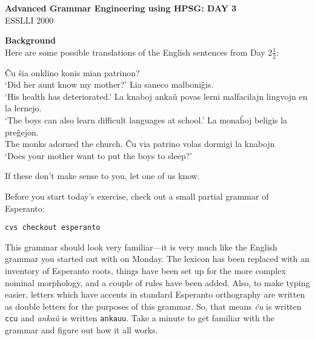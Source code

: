 \documentclass[11pt]{article}
\begin{document}
\begin{center}
\textbf{Advanced Grammar Engineering using HPSG: DAY 3}\\
ESSLLI 2000
\end{center}

\smallskip
\noindent\textbf{Background}\\
Here are some possible translations of the English sentences from Day
2$\frac12$:
\begin{exe}
\ex
\begin{xlist}
\ex \^Cu \^sia onklino konis mian patrinon?\\
`Did her aunt know my mother?'
\ex Lia saneco malboni\^gis.\\
`His health has deteriorated.'
\ex La knaboj anka\v{u} povas lerni malfacilajn lingvojn en la lernejo.\\
`The boys can also learn difficult languages at school.'
\ex La mona\^hoj beligis la pre\^gejon.\\
The monks adorned the church.
\ex \^Cu via patrino volas dormigi la knabojn\\
`Does your mother want to put the boys to sleep?'
\end{xlist}
\end{exe}
If these don't make sense to you, let one of us know. 

Before you start today's exercise, check out a small partial grammar of
Esperanto:
\begin{verbatim}
cvs checkout esperanto
\end{verbatim}
This grammar should look very familiar---it is very much like the English
grammar you started out with on Monday. The lexicon has been replaced with an
inventory of Esperanto roots, things have been set up for the more complex
nominal morphology, and a couple of rules have been added. Also, to make
typing easier, letters which have accents in standard Esperanto orthography
are written as double letters for the purposes of this grammar.  So, that
means \emph{\^cu} is written \texttt{ccu} and \emph{anka\v{u}} is written
\texttt{ankauu}. Take a minute to get familiar with the grammar and figure out 
how it all works.
\end{document}

